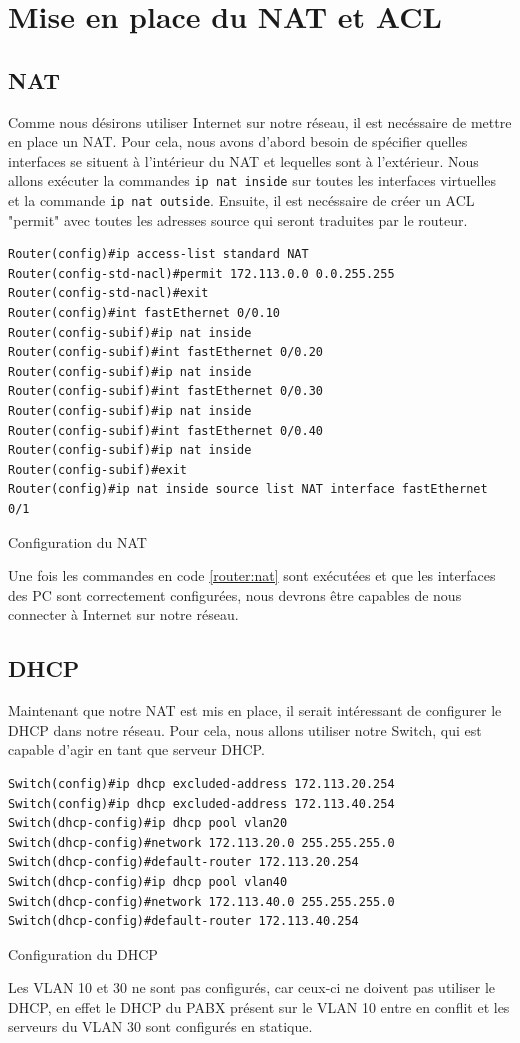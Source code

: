 \documentclass{article}
\begin{document}
\section{Mise en place du NAT et ACL}
\subsection{NAT}
Comme nous désirons utiliser Internet sur notre réseau, il est necéssaire de mettre en place un NAT. Pour cela, nous avons d'abord besoin de spécifier quelles interfaces se situent à l'intérieur du NAT et lequelles sont à l'extérieur.
Nous allons exécuter la commandes \verb|ip nat inside| sur toutes les interfaces virtuelles et la commande \verb|ip nat outside|. Ensuite, il est necéssaire de créer un ACL "permit" avec toutes les adresses source qui seront traduites par le routeur.
\begin{listing}[H]
    \begin{verbatim}
Router(config)#ip access-list standard NAT
Router(config-std-nacl)#permit 172.113.0.0 0.0.255.255
Router(config-std-nacl)#exit
Router(config)#int fastEthernet 0/0.10
Router(config-subif)#ip nat inside
Router(config-subif)#int fastEthernet 0/0.20
Router(config-subif)#ip nat inside
Router(config-subif)#int fastEthernet 0/0.30
Router(config-subif)#ip nat inside
Router(config-subif)#int fastEthernet 0/0.40
Router(config-subif)#ip nat inside
Router(config-subif)#exit
Router(config)#ip nat inside source list NAT interface fastEthernet 0/1
    \end{verbatim}
    \caption{Configuration du NAT}
    \label{router:nat}
\end{listing}
Une fois les commandes en code \ref{router:nat} sont exécutées et que les interfaces des PC sont correctement configurées, nous devrons être capables de nous connecter à Internet sur notre réseau.
\subsection{DHCP}
Maintenant que notre NAT est mis en place, il serait intéressant de configurer le DHCP dans notre réseau.
Pour cela, nous allons utiliser notre Switch, qui est capable d'agir en tant que serveur DHCP.
\begin{listing}[H]
    \begin{verbatim}
Switch(config)#ip dhcp excluded-address 172.113.20.254
Switch(config)#ip dhcp excluded-address 172.113.40.254
Switch(dhcp-config)#ip dhcp pool vlan20
Switch(dhcp-config)#network 172.113.20.0 255.255.255.0
Switch(dhcp-config)#default-router 172.113.20.254
Switch(dhcp-config)#ip dhcp pool vlan40
Switch(dhcp-config)#network 172.113.40.0 255.255.255.0
Switch(dhcp-config)#default-router 172.113.40.254
    \end{verbatim}
    \caption{Configuration du DHCP}
    \label{switch:dhcp}
\end{listing}
Les VLAN 10 et 30 ne sont pas configurés, car ceux-ci ne doivent pas utiliser le DHCP, en effet le DHCP du PABX présent sur le VLAN 10 entre en conflit et les serveurs du VLAN 30 sont configurés en statique.
\newpage
\end{document}
